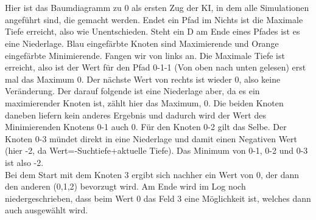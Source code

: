 \documentclass[12pt,a4paper,ngerman]{article}
\begin{document}
	\\\\
	Hier ist das Baumdiagramm zu 0 als ersten Zug der KI, in dem alle Simulationen angeführt sind, die gemacht werden. Endet ein Pfad im Nichts ist die Maximale Tiefe erreicht, also wie Unentschieden. Steht ein D am Ende eines Pfades ist es eine Niederlage. Blau eingefärbte Knoten sind Maximierende und Orange eingefärbte Minimierende. Fangen wir von links an. Die Maximale Tiefe ist erreicht, also ist der Wert für den Pfad 0-1-1 (Von oben nach unten gelesen) erst mal das Maximum 0. Der nächste Wert von rechts ist wieder 0, also keine Veränderung. Der darauf folgende ist eine Niederlage aber, da es ein maximierender Knoten ist, zählt hier das Maximum, 0. Die beiden Knoten daneben liefern kein anderes Ergebnis und dadurch wird der Wert des Minimierenden Knotens 0-1 auch 0. Für den Knoten 0-2 gilt das Selbe. Der Knoten 0-3 mündet direkt in eine Niederlage und damit einen Negativen Wert (hier -2, da Wert=-Suchtiefe+aktuelle Tiefe). Das Minimum von 0-1, 0-2 und 0-3 ist also -2.\\
	Bei dem Start mit dem Knoten 3 ergibt sich nachher ein Wert von 0, der dann den anderen (0,1,2) bevorzugt wird. Am Ende wird im Log noch niedergeschrieben, dass beim Wert 0 das Feld 3 eine Möglichkeit ist, welches dann auch ausgewählt wird.
\end{document}
